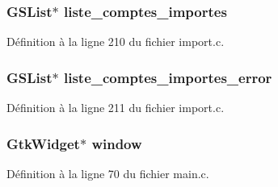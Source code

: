 \subsubsection[{liste\_\-comptes\_\-importes}]{\setlength{\rightskip}{0pt plus 5cm}GSList$\ast$ {\bf liste\_\-comptes\_\-importes}}\label{import__csv_8c_a78273b1077a17a5b03056ffebb17a140}


Définition à la ligne 210 du fichier import.c.

\subsubsection[{liste\_\-comptes\_\-importes\_\-error}]{\setlength{\rightskip}{0pt plus 5cm}GSList$\ast$ {\bf liste\_\-comptes\_\-importes\_\-error}}\label{import__csv_8c_a6e161f53c7a853cfac180c82953b5111}


Définition à la ligne 211 du fichier import.c.

\subsubsection[{window}]{\setlength{\rightskip}{0pt plus 5cm}GtkWidget$\ast$ {\bf window}}\label{import__csv_8c_a3d346c08cf2d67c388caabffb412b293}


Définition à la ligne 70 du fichier main.c.

